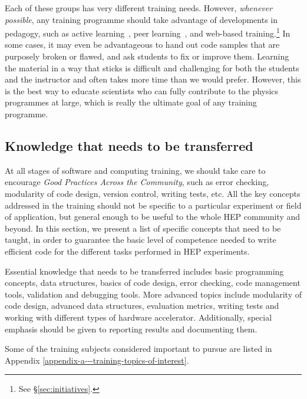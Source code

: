 \documentclass[12pt,a4paper]{article}
\begin{document}
Each of these groups has very different training needs. However,
\emph{whenever possible}, any training programme should take advantage of
developments in pedagogy, such as active
learning~\cite{ActiveLearning}, peer learning~\cite{PeerLearning}, and
web-based training.\footnote{See \S\ref{sec:initiatives}.} In some cases, it may
even be advantageous to hand out code samples that are purposely broken or
flawed, and ask students to fix or improve them. Learning the material in a way
that sticks is difficult and challenging for both the students
and the instructor and often takes more time than we would prefer. However, this
is the best way to educate scientists who can fully
contribute to the physics programmes at large, which is really the ultimate goal
of any training programme.

\subsection{Knowledge that needs to be transferred}

At all stages of software and computing training, we should take care to
encourage \emph{Good Practices Across the Community}, such as error
checking, modularity of code design, version control, writing tests, etc. All
the key concepts addressed in the training should not be specific to a
particular experiment or field of application, but general enough to be useful
to the whole HEP community and beyond. In this section, we present a
list of specific concepts that need to be taught, in
order to guarantee the basic level of competence needed to write efficient code
for the different tasks performed in HEP experiments.
 
Essential knowledge that needs to be transferred includes basic
programming concepts, data structures, basics of code design, error checking,
code management tools, validation and debugging tools. More advanced topics
include modularity of code design, advanced data structures, evaluation metrics,
writing tests and working with different types of hardware accelerator.
Additionally, special emphasis should be given to
reporting results and documenting them.

Some of the training subjects considered important to pursue are
listed in Appendix \ref{appendix-a---training-topics-of-interest}.


\end{document}
